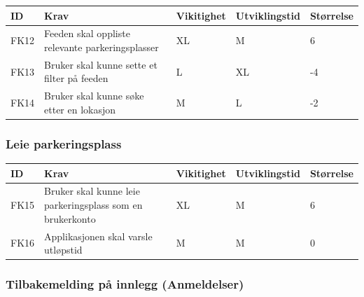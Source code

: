 \documentclass[12pt]{article}
\newcommand{\cellr}{\cellcolor{red!25}}
\newcommand{\cello}{\cellcolor{orange!25}}
\newcommand{\celly}{\cellcolor{yellow!25}}
\newcommand{\cellg}{\cellcolor{green!25}}
\begin{document}
        \begin{tabular}{|p{2cm}|p{6cm}|
            >{\centering\arraybackslash}p{2cm}|
            >{\centering\arraybackslash}p{2cm}|
            >{\centering\arraybackslash}p{2cm}|} 
            \hline
            \bf ID & \bf Krav & \bf Vikitighet & \bf Utviklingstid & \bf Størrelse\\
            \hline
            FK12
            &
            Feeden skal oppliste relevante parkeringsplasser
            & XL & M & \cellg 6\\
            \hline
            FK13
            &
            Bruker skal kunne sette et filter på feeden
            & L & XL & \cellr -4\\
            \hline
            FK14
            &
            Bruker skal kunne søke etter en lokasjon
            & M & L & \cello -2\\
            \hline
        \end{tabular}
        
        \subsubsection{Leie parkeringsplass}
        
        \begin{tabular}{|p{2cm}|p{6cm}|
            >{\centering\arraybackslash}p{2cm}|
            >{\centering\arraybackslash}p{2cm}|
            >{\centering\arraybackslash}p{2cm}|} 
            \hline
            \bf ID & \bf Krav & \bf Vikitighet & \bf Utviklingstid & \bf Størrelse\\
            \hline
            FK15
            &
            Bruker skal kunne leie parkeringsplass som en brukerkonto
            & XL & M & \cellg 6\\
            \hline
            FK16
            &
            Applikasjonen skal varsle utløpstid
            & M & M & \celly 0\\
            \hline
        \end{tabular}
        
        \subsubsection{Tilbakemelding på innlegg (Anmeldelser)}
        
\end{document}
